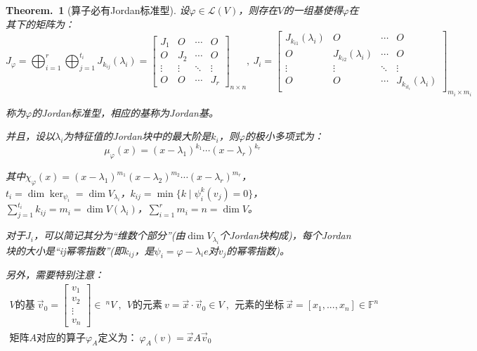 \documentclass[zihao=-4,UTF8]{report}
\theoremstyle{mystyle} %
\newtheorem{theorem}{Theorem.\,}
\begin{document}
\begin{theorem}[算子必有Jordan标准型]\label{算子必有Jordan标准型}
设$\varphi \in \mathscr{L}(V)$，则存在$V$的一组基使得$\varphi$在其下的矩阵为：
\begin{equation*}
    J_{\varphi} = \bigoplus_{i=1}^{r}\bigoplus_{j=1}^{t_i} J_{k_{ij}}(\lambda_i)= 
    \begin{bmatrix}  
        J_1& O& \cdots  & O \\  
        O& J_2& \cdots  & O \\  
        \vdots & \vdots & \ddots & \vdots \\  
        O& O& \cdots  & J_r  
    \end{bmatrix}_{n \times n},\ 
    J_i = 
    \begin{bmatrix}
        J_{k_{i1}}(\lambda_i)& O& \cdots  & O \\  
        O& J_{k_{i2}}(\lambda_i)& \cdots  & O \\  
        \vdots & \vdots & \ddots & \vdots \\  
        O& O& \cdots  & J_{k_{it_i}}(\lambda_i)
    \end{bmatrix}_{m_i \times m_i}
\end{equation*}
{\color{gray}\small 称为$\varphi$的Jordan标准型，相应的基称为Jordan基。\par}
并且，设以$\lambda_i$为特征值的Jordan块中的最大阶是$k_i$，则$\varphi$的极小多项式为：
\begin{equation*}
    \mu_{\varphi}(x) =  (x-\lambda_1)^{k_1}\cdots (x-\lambda_r)^{k_r}
\end{equation*}
{\color{gray}\small 其中$\chi_{\varphi}(x) = (x-\lambda_1)^{m_1}(x-\lambda_2)^{m_2} \cdots (x-\lambda_r)^{m_r}$，$t_i = \dim \ker_{\psi_i} = \dim V_{\lambda_i}$，$k_{ij}= \min \{k\mid \psi_i^k(v_j) = 0 \}$，$\sum_{j=1}^{t_i} k_{ij} = m_i = \dim V(\lambda_i)$，$\sum_{i=1}^{r}m_i = n = \dim V$。\par}
{\color{gray}\small 对于$J_i$，可以简记其分为“维数个部分”(由$\dim V_{\lambda_i}$个Jordan块构成)，每个Jordan块的大小是“ij幂零指数”(即$k_{ij}$，是$\psi_i = \varphi - \lambda_i e$对$v_j$的幂零指数)。\par
{\color{red}
另外，需要特别注意：
\begin{gather*}
    \text{$V$的基}\ \vec{v}_0 = 
    \begin{bmatrix}
        v_1\\
        v_2\\
        \vdots\\
        v_n
    \end{bmatrix} \in\ {^nV}\ ,\ \ 
    \text{$V$的元素}\ v = \vec{x}\cdot \vec{v}_0 \in V \ ,\ \ 
    \text{元素的坐标}\ \vec{x} = \left[x_1,...,x_n\right]\in \mathbb{F}^n\\
    \text{矩阵$A$对应的算子$\varphi_{A}$定义为：}\ \varphi_A(v) = \vec{x}A\vec{v}_0 
\end{gather*}}}


\end{theorem}
\end{document}
